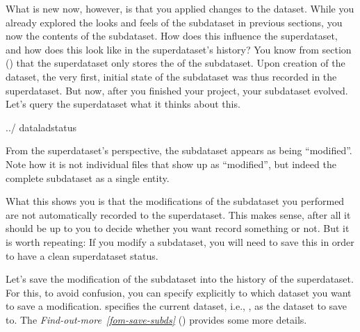\sphinxAtStartPar
What is new now, however, is that you applied changes to the dataset. While
you already explored the looks and feels of the  subdataset in
previous sections, you now  the contents of the 
subdataset.
How does this influence the superdataset, and how does this look like in the
superdataset’s history? You know from section {\hyperref[\detokenize{basics/101-106-nesting:nesting}]{}} () that the
superdataset only stores the  of the subdataset. Upon creation of the
dataset, the very first, initial state of the subdataset was thus recorded in
the superdataset. But now, after you finished your project, your subdataset
evolved. Let’s query the superdataset what it thinks about this.

\begin{sphinxVerbatim}[commandchars=\\\{\}]
../
dataladstatus
\end{sphinxVerbatim}

\sphinxAtStartPar
From the superdataset’s perspective, the subdataset appears as being
“modified”. Note how it is not individual files that show up as “modified”, but
indeed the complete subdataset as a single entity.

\sphinxAtStartPar
What this shows you is that the modifications of the subdataset you performed are not
automatically recorded to the superdataset. This makes sense, after all it
should be up to you to decide whether you want record something or not.
But it is worth repeating: If you modify a subdataset, you will need to save
this  in order to have a clean superdataset status.

\sphinxAtStartPar
Let’s save the modification of the subdataset into the history of the
superdataset. For this, to avoid confusion, you can specify explicitly to
which dataset you want to save a modification.  specifies the current
dataset, i.e., , as the dataset to save to.
The \textit{Find-out-more}~{\findoutmoreiconinline}\textit{\ref{fom-save-subds}} {\hyperref[\detokenize{basics/101-132-advancednesting:fom-save-subds}]{}} () provides some more details.

